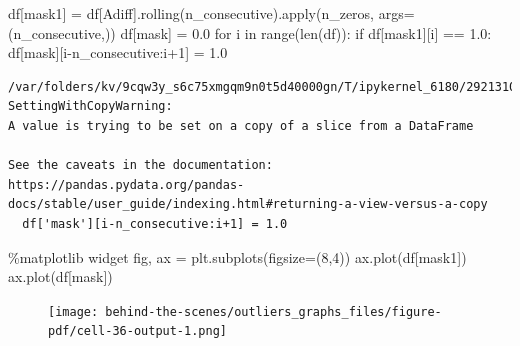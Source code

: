 \documentclass[
  letterpaper,
  DIV=11,
  numbers=noendperiod,
  oneside]{scrreprt}
\newenvironment{Shaded}{\begin{snugshade}}{\end{snugshade}}
\newcommand{\BuiltInTok}[1]{\textcolor[rgb]{0.00,0.23,0.31}{#1}}
\newcommand{\ControlFlowTok}[1]{\textcolor[rgb]{0.00,0.23,0.31}{#1}}
\newcommand{\DecValTok}[1]{\textcolor[rgb]{0.68,0.00,0.00}{#1}}
\newcommand{\FloatTok}[1]{\textcolor[rgb]{0.68,0.00,0.00}{#1}}
\newcommand{\KeywordTok}[1]{\textcolor[rgb]{0.00,0.23,0.31}{#1}}
\newcommand{\NormalTok}[1]{\textcolor[rgb]{0.00,0.23,0.31}{#1}}
\newcommand{\OperatorTok}[1]{\textcolor[rgb]{0.37,0.37,0.37}{#1}}
\newcommand{\StringTok}[1]{\textcolor[rgb]{0.13,0.47,0.30}{#1}}
\begin{document}
\begin{Shaded}
\begin{Highlighting}[]
\NormalTok{df[}\StringTok{\textquotesingle{}mask1\textquotesingle{}}\NormalTok{] }\OperatorTok{=}\NormalTok{ df[}\StringTok{\textquotesingle{}Adiff\textquotesingle{}}\NormalTok{].rolling(n\_consecutive).}\BuiltInTok{apply}\NormalTok{(n\_zeros, args}\OperatorTok{=}\NormalTok{(n\_consecutive,))}
\NormalTok{df[}\StringTok{\textquotesingle{}mask\textquotesingle{}}\NormalTok{] }\OperatorTok{=} \FloatTok{0.0}
\ControlFlowTok{for}\NormalTok{ i }\KeywordTok{in} \BuiltInTok{range}\NormalTok{(}\BuiltInTok{len}\NormalTok{(df)):}
    \ControlFlowTok{if}\NormalTok{ df[}\StringTok{\textquotesingle{}mask1\textquotesingle{}}\NormalTok{][i] }\OperatorTok{==} \FloatTok{1.0}\NormalTok{:}
\NormalTok{        df[}\StringTok{\textquotesingle{}mask\textquotesingle{}}\NormalTok{][i}\OperatorTok{{-}}\NormalTok{n\_consecutive:i}\OperatorTok{+}\DecValTok{1}\NormalTok{] }\OperatorTok{=} \FloatTok{1.0}
\end{Highlighting}
\end{Shaded}

\begin{verbatim}
/var/folders/kv/9cqw3y_s6c75xmgqm9n0t5d40000gn/T/ipykernel_6180/2921310703.py:5: SettingWithCopyWarning: 
A value is trying to be set on a copy of a slice from a DataFrame

See the caveats in the documentation: https://pandas.pydata.org/pandas-docs/stable/user_guide/indexing.html#returning-a-view-versus-a-copy
  df['mask'][i-n_consecutive:i+1] = 1.0
\end{verbatim}

\begin{Shaded}
\begin{Highlighting}[]
\OperatorTok{\%}\NormalTok{matplotlib widget}
\NormalTok{fig, ax }\OperatorTok{=}\NormalTok{ plt.subplots(figsize}\OperatorTok{=}\NormalTok{(}\DecValTok{8}\NormalTok{,}\DecValTok{4}\NormalTok{))}
\NormalTok{ax.plot(df[}\StringTok{\textquotesingle{}mask1\textquotesingle{}}\NormalTok{])}
\NormalTok{ax.plot(df[}\StringTok{\textquotesingle{}mask\textquotesingle{}}\NormalTok{])}
\end{Highlighting}
\end{Shaded}

\begin{figure}[H]

{\centering \texttt{[image: behind-the-scenes/outliers\_graphs\_files/figure-pdf/cell-36-output-1.png]}

}

\end{figure}
\end{document}
